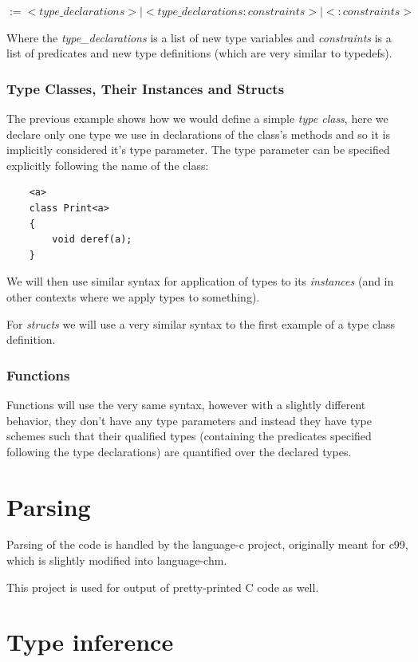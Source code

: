 $:= <type\_declarations> | <type\_declarations : constraints> | < : constraints >$

Where the \emph{type\_declarations} is a list of new type variables and \emph{constraints} is a list of predicates and new type definitions (which are very similar to typedefs).

\subsubsection{Type Classes, Their Instances and Structs}

The previous example shows how we would define a simple \emph{type class}, here we declare only one type we use in declarations of the class's methods and so it is implicitly considered it's type parameter. The type parameter can be specified explicitly following the name of the class:

\begin{lstlisting}
    <a>
    class Print<a>
    {
        void deref(a);
    }
\end{lstlisting}

We will then use similar syntax for application of types to its \emph{instances} (and in other contexts where we apply types to something).

For \emph{structs} we will use a very similar syntax to the first example of a type class definition.

\subsubsection{Functions}

Functions will use the very same syntax, however with a slightly different behavior, they don't have any type parameters and instead they have type schemes such that their qualified types (containing the predicates specified following the type declarations) are quantified over the declared types.

\section{Parsing}

Parsing of the code is handled by the language-c project, originally meant for c99, which is slightly modified into language-chm. %

This project is used for output of pretty-printed C code as well.

\section{Type inference}

